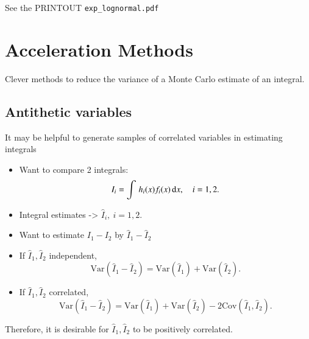\documentclass[11pt,english]{scrbook}
\begin{document}
See the PRINTOUT \texttt{exp\_lognormal.pdf}




\section{Acceleration Methods}
\label{sec:orgb4c7a7c}

Clever methods to reduce the variance of a Monte Carlo estimate of an integral.

\subsection{Antithetic variables}
\label{sec:org651842a}

It may be helpful to generate samples of correlated variables in estimating integrals

\begin{itemize}
\item Want to compare 2 integrals:
\[
  I_{i} = \int \, h_{i}(x)f_{i}(x)\, \mathrm{d} x, \quad i = 1,2.
  \]

\item Integral estimates -> \(\hat{I}_{i},\ i=1,2.\)

\item Want to estimate \(I_{1} - I_{2}\) by  \(\hat{I}_{1} - \hat{I}_{2}\)

\item If \(\hat{I}_{1},\hat{I}_{2}\) independent,
\[
  \mathrm{Var}(\hat{I}_{1} - \hat{I}_{2}) = \mathrm{Var}(\hat{I}_{1}) + \mathrm{Var}(\hat{I}_{2}).
  \]

\item If \(\hat{I}_{1},\hat{I}_{2}\) correlated,
\[
  \mathrm{Var}(\hat{I}_{1} - \hat{I}_{2}) = \mathrm{Var}(\hat{I}_{1}) + \mathrm{Var}(\hat{I}_{2}) - 2\mathrm{Cov}(\hat{I}_{1},\hat{I}_{2}).
  \]
\end{itemize}

Therefore, it is desirable for  \(\hat{I}_{1},\hat{I}_{2}\) to be positively correlated.
\end{document}
